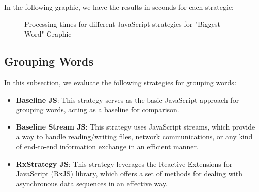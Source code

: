 In the following graphic, we have the results in seconds for each strategie:


\begin{figure}[H]
    \raggedright
    \caption{Processing times for different JavaScript strategies for "Biggest Word" Graphic}
    \label{fig:biggest_word_processing_times_js}
\end{figure}

\clearpage


\subsection{Grouping Words}
\label{subsec:grouping_words_js}

In this subsection, we evaluate the following strategies for grouping words:

\begin{itemize}
    \item \textbf{Baseline JS}: This strategy serves as the basic JavaScript approach for grouping words, acting as a baseline for comparison.
    \item \textbf{Baseline Stream JS}: This strategy uses JavaScript streams, which provide a way to handle reading/writing files, network communications, or any kind of end-to-end information exchange in an efficient manner.
    \item \textbf{RxStrategy JS}: This strategy leverages the Reactive Extensions for JavaScript (RxJS) library, which offers a set of methods for dealing with asynchronous data sequences in an effective way.
\end{itemize}

